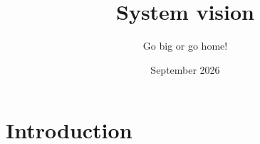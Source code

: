 \documentclass{article}
\title{System vision}
\author{Go big or go home!}
\date{September 2026}
\begin{document}
\maketitle

\section{Introduction}
\end{document}
